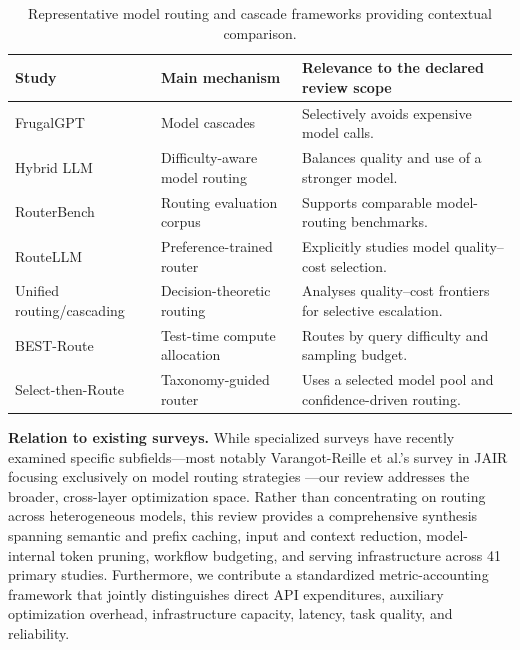 \IfFileExists{jair.cls}{\documentclass{jair}}{\documentclass[manuscript,nonacm,screen]{acmart}}
\begin{document}
\begin{table}[t]
\caption{Representative model routing and cascade frameworks providing contextual comparison.}
\label{tab:routing-gap}
\centering
\footnotesize
\begin{tabularx}{\textwidth}{@{}>{\RaggedRight\arraybackslash}p{} >{\RaggedRight\arraybackslash}p{} >{\RaggedRight\arraybackslash}X@{}}
\toprule Study & Main mechanism & Relevance to the declared review scope \\
\midrule
FrugalGPT \cite{FrugalGPT} & Model cascades & Selectively avoids expensive model calls. \\
Hybrid LLM \cite{HybridLLM} & Difficulty-aware model routing & Balances quality and use of a stronger model. \\
RouterBench \cite{RouterBench} & Routing evaluation corpus & Supports comparable model-routing benchmarks. \\
RouteLLM \cite{RouteLLM} & Preference-trained router & Explicitly studies model quality--cost selection. \\
Unified routing/cascading \cite{UnifiedRouting} & Decision-theoretic routing & Analyses quality--cost frontiers for selective escalation. \\
BEST-Route \cite{BESTRoute} & Test-time compute allocation & Routes by query difficulty and sampling budget. \\
Select-then-Route \cite{SelectThenRoute} & Taxonomy-guided router & Uses a selected model pool and confidence-driven routing. \\
\bottomrule
\end{tabularx}
\end{table}

\textbf{Relation to existing surveys.} While specialized surveys have recently examined specific subfields---most notably Varangot-Reille et al.'s survey in JAIR focusing exclusively on model routing strategies \cite{JAIRRoutingSurvey}---our review addresses the broader, cross-layer optimization space. Rather than concentrating on routing across heterogeneous models, this review provides a comprehensive synthesis spanning semantic and prefix caching, input and context reduction, model-internal token pruning, workflow budgeting, and serving infrastructure across 41 primary studies. Furthermore, we contribute a standardized metric-accounting framework that jointly distinguishes direct API expenditures, auxiliary optimization overhead, infrastructure capacity, latency, task quality, and reliability.
\end{document}

